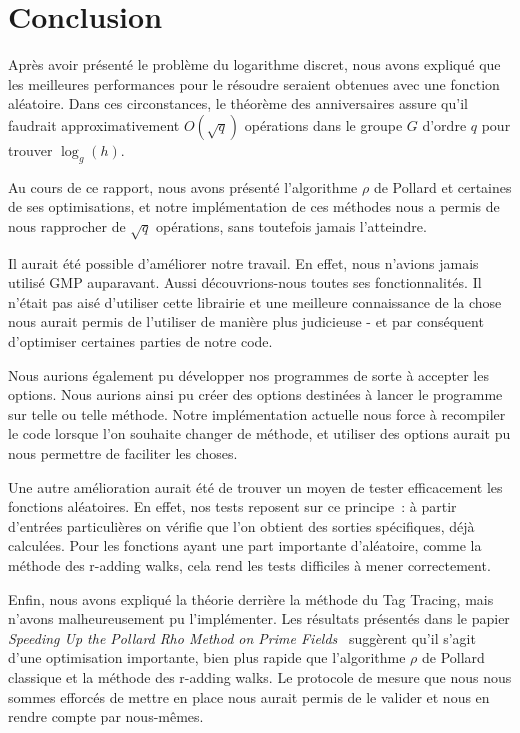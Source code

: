\chapter*{Conclusion}
Après avoir présenté le problème du logarithme discret, nous avons expliqué que les meilleures performances pour le résoudre seraient obtenues avec une fonction aléatoire. Dans ces circonstances, le théorème des anniversaires assure qu'il faudrait approximativement $O(\sqrt{q})$ opérations dans le groupe $G$ d'ordre $q$ pour trouver $\log_g(h)$.

Au cours de ce rapport, nous avons présenté l'algorithme $\rho$ de Pollard et certaines de ses optimisations, et notre implémentation de ces méthodes nous a permis de nous rapprocher de $\sqrt{q}$ opérations, sans toutefois jamais l'atteindre.

Il aurait été possible d'améliorer notre travail. En effet, nous n'avions jamais utilisé GMP auparavant. Aussi découvrions-nous toutes ses fonctionnalités. Il n'était pas aisé d'utiliser cette librairie et une meilleure connaissance de la chose nous aurait permis de l'utiliser de manière plus judicieuse - et par conséquent d'optimiser certaines parties de notre code.

Nous aurions également pu développer nos programmes de sorte à accepter les options. Nous aurions ainsi pu créer des options destinées à lancer le programme sur telle ou telle méthode. Notre implémentation actuelle nous force à recompiler le code lorsque l'on souhaite changer de méthode, et utiliser des options aurait pu nous permettre de faciliter les choses.

Une autre amélioration aurait été de trouver un moyen de tester efficacement les fonctions aléatoires. En effet, nos tests reposent sur ce principe~: à partir d'entrées particulières on vérifie que l'on obtient des sorties spécifiques, déjà calculées. Pour les fonctions ayant une part importante d'aléatoire, comme la méthode des r-adding walks, cela rend les tests difficiles à mener correctement.

Enfin, nous avons expliqué la théorie derrière la méthode du Tag Tracing, mais n'avons malheureusement pu l'implémenter. Les résultats présentés dans le papier \textit{Speeding Up the Pollard Rho Method on Prime Fields}~\autocite[13]{pollard1} suggèrent qu'il s'agit d'une optimisation importante, bien plus rapide que l'algorithme $\rho$ de Pollard classique et la méthode des r-adding walks. Le protocole de mesure que nous nous sommes efforcés de mettre en place nous aurait permis de le valider et nous en rendre compte par nous-mêmes.
